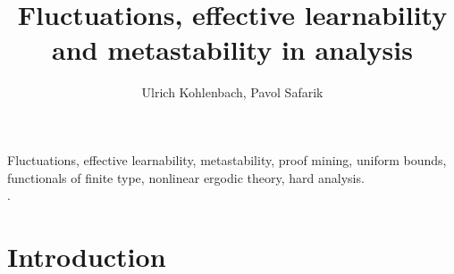 \documentclass[1p]{elsarticle}
\theoremstyle{plain}
\theoremstyle{definition}
\theoremstyle{remark}
\theoremstyle{definition}
\begin{document}


\title{Fluctuations, effective learnability and metastability in analysis}
\author{Ulrich Kohlenbach, Pavol Safarik}
\address{Department of Mathematics, Technische Universit\"at Darmstadt, Schlossgartenstra{\ss}e 7, 64289 Darmstadt, Germany}

\date{}

\begin{abstract}
\end{abstract}

\begin{keyword}
Fluctuations, effective learnability, metastability, proof mining, uniform 
bounds, functionals of finite type, nonlinear ergodic theory, hard analysis.\\
.
\end{keyword}


\maketitle


\section{Introduction}

\newtheorem{definition}{Definition}[section]
\newtheorem{proposition}[definition]{Proposition}
\newtheorem{theorem}[definition]{Theorem}
\newtheorem{corollary}[definition]{Corollary}
\newtheorem{exercise}[definition]{Exercise}
\newtheorem{clm}[definition]{Claim}
\newtheorem{example}[definition]{Example}
\newtheorem{notation}[definition]{Notation}
\newtheorem{application}[definition]{Application} 
\end{document}
